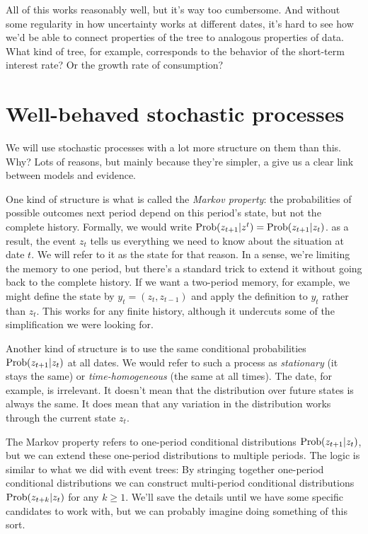 \documentclass[11pt]{article}
\begin{document}
All of this works reasonably well, but it's way too cumbersome.
And without some regularity in how uncertainty works at different dates,
it's hard to see how we'd be able to connect properties of the tree
to analogous properties of data.
What kind of tree, for example, corresponds to the behavior of the short-term
interest rate?  Or the growth rate of consumption?



\section{Well-behaved stochastic processes}


We will use stochastic processes with a lot more structure
on them than this.
Why?  Lots of reasons, but mainly because they're simpler,
a give us a clear link between models and evidence.

One kind of structure is what is called the {\it Markov property\/}:
the probabilities of possible outcomes next period
depend on this period's state, but not the complete history.
Formally, we would write
$\mbox{Prob}(z_{t+1} | z^t ) = \mbox{Prob}(z_{t+1} | z_t ) $.
as a result, the event $z_t$ tells us everything we need to know
about the situation at date $t$.
We will refer to it as the state for that reason.
In a sense, we're limiting the memory to one period,
but there's a standard trick to extend it without going back to the complete history.
If we want a two-period memory, for example, we might define the state by
$y_t = (z_t, z_{t-1})$ and apply the definition to
$y_t$ rather than $z_t$.
This works for any finite history, although it undercuts some
of the simplification we were looking for.


Another kind of structure is to use the same conditional
probabilities $\mbox{Prob}(z_{t+1} | z_t)$ at all dates.
We would refer to such a process as {\it stationary\/}
(it stays the same) or
{\it time-homogeneous\/} (the same at all times).
The date, for example, is irrelevant.
It doesn't mean that the distribution over future states is always the same.
It does mean that any variation in the distribution
works through the current state $z_t$.

The Markov property refers to one-period conditional distributions
 $\mbox{Prob}(z_{t+1} | z_t) $, 
but we can extend these one-period distributions to multiple periods.
The logic is similar to what we did with event trees:   
By stringing together one-period conditional distributions
we can construct multi-period conditional distributions
$\mbox{Prob}(z_{t+k} | z_t) $ for any $k \geq 1$.
We'll save the details until we have some specific candidates to work
with, but we can probably imagine doing something of this sort.
\end{document}
